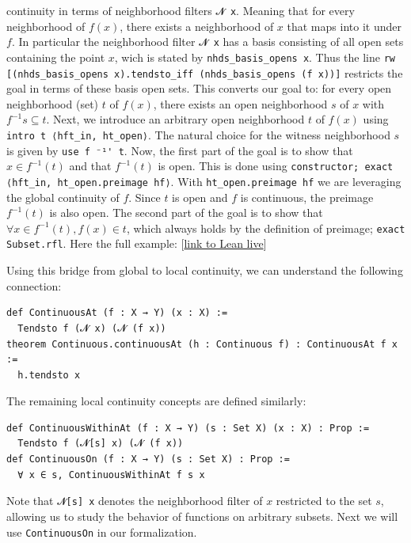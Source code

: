 \begin{example}
    continuity in terms of neighborhood filters \lstinline[language=lean]|𝓝 x|.
    Meaning that for every neighborhood of $f(x)$, there exists a neighborhood of $x$
    that maps into it under $f$.
    In particular the neighborhood filter \lstinline[language=lean]|𝓝 x| has a basis
    consisting of all open sets containing the point $x$,
    wich is stated by \lstinline[language=lean]|nhds_basis_opens x|.
    Thus the line
    \lstinline[language=lean]|rw [(nhds_basis_opens x).tendsto_iff (nhds_basis_opens (f x))]|
    restricts the goal in terms of these basis open sets.
    This converts our goal to: for every open neighborhood (set) $t$ of $f(x)$,
    there exists an open neighborhood $s$ of $x$ with $f^{-1} s \subseteq t$.
    Next, we introduce an arbitrary open neighborhood $t$ of $f(x)$
    using \lstinline[language=lean]|intro t ⟨hft_in, ht_open⟩|.
    The natural choice for the witness neighborhood $s$ is
    given by \lstinline[language=lean]|use f ⁻¹' t|.
    Now, the first part of the goal is to show that $x \in f^{-1}(t)$
    and that $f^{-1}(t)$ is open.
    This is done using
    \lstinline[language=lean]|constructor; exact ⟨hft_in, ht_open.preimage hf⟩|.
    With \lstinline[language=lean]|ht_open.preimage hf| we are
    leveraging the global continuity of $f$. Since $t$ is open and $f$ is continuous,
    the preimage $f^{-1}(t)$ is also open.
    The second part of the goal is to show that $\forall x \in f^{-1}(t), f(x) \in t$,
    which always holds by the definition of preimage; \lstinline[language=lean]|exact Subset.rfl|.
    Here the full example: [\href{https://live.lean-lang.org/#codez=JYWwDg9gTgLgBAWQIYwBYBtgCMBQOJgCmAdnACoEToQDmAnnAGLDoyFRwDKhMOAbkijAkWdITgBvABpwAmnABacAFzk6RAFQBffoOGjxAbQqRqNYAGMk6TmCQXxUgLpxjlM5eu3742U91CImJwABQAZipwMoBJhHIAlKEAHpFScXhohNCEIHAAwhDEMMDEAK4QJQDOAOQ1AHRsxAAmFTAQoagRqvmFxWWVcGEJIYkJyjhw5CTNrQOhgKwbgLs7cCPzS+HLcaMAvHBYdONwUADuriHEqM0A+lhIFcAVlwQkFRv1Uy0Ql8BhEWcXDzc7g8nsQXusRnF/BNijAoG14IAL8g6MC+xAANHBUCiQYBL8gOlXEEUA3gQATqqcF4EwsBRaUBKFlaUAOAHa4IREvZEcjURisY8iMRamAoIRQEgaOIOniJqz2ZyuCUsBUeLUoGF0EA}{link to Lean live}]

    Using this bridge from global to local continuity,
    we can understand the following connection:
    \begin{lstlisting}[language=lean]
def ContinuousAt (f : X → Y) (x : X) :=
  Tendsto f (𝓝 x) (𝓝 (f x))
theorem Continuous.continuousAt (h : Continuous f) : ContinuousAt f x :=
  h.tendsto x
\end{lstlisting}
    The remaining local continuity concepts are defined similarly:
    \begin{lstlisting}[language=lean]
def ContinuousWithinAt (f : X → Y) (s : Set X) (x : X) : Prop :=
  Tendsto f (𝓝[s] x) (𝓝 (f x))
def ContinuousOn (f : X → Y) (s : Set X) : Prop :=
  ∀ x ∈ s, ContinuousWithinAt f s x
\end{lstlisting}
    Note that \lstinline[language=lean]|𝓝[s] x| denotes the neighborhood filter
    of $x$ restricted
    to the set $s$, allowing us to study the behavior of functions on arbitrary subsets.
    Next we will use \lstinline[language=lean]|ContinuousOn| in our formalization.
\end{example}
